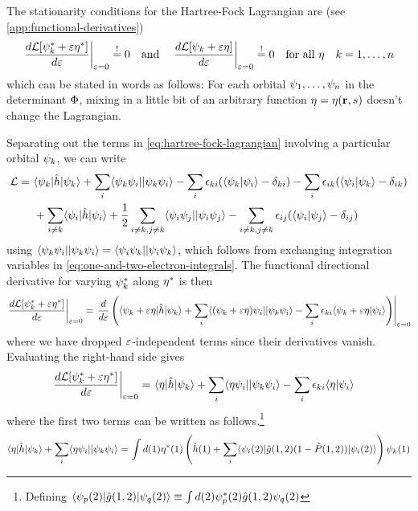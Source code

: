 \documentclass[11pt]{article}
\numberwithin{equation}{section}
\begin{document}
The stationarity conditions for the Hartree-Fock Lagrangian are (see \cref{app:functional-derivatives})
\begin{align}\label{eq:hartree-fock-lagrangian-stationarity}
\left.
  \frac {d\mathcal{L}[\psi _k^*+\varepsilon \eta ^*]}{d\varepsilon}
\right|_{\varepsilon=0}
\overset{!}=
  0
\hspace{10pt}
  \text{and}
\hspace{10pt}
\left.
  \frac {d\mathcal{L}[\psi _k+\varepsilon \eta ]}{d\varepsilon}
\right|_{\varepsilon=0}
\overset{!}=
  0
\hspace{10pt}
  \text{for all $\eta $}
&&
  k=1,\ldots,n
\end{align}
which can be stated in words as follows: For each orbital $\psi _1,\ldots,\psi _n$ in the determinant $\Phi $, mixing in a little bit of an arbitrary function $\eta=\eta(\mathbf{r},s)$ doesn't change the Lagrangian.

Separating out the terms in \cref{eq:hartree-fock-lagrangian} involving a particular orbital $\psi _k$, we can write
\begin{align*}
  \mathcal{L}
=&\
  \langle\psi _k|\hat{h}|\psi _k\rangle
+
  \sum_i
  \langle\psi _k\psi _i||\psi _k\psi _i\rangle
-
  \sum_i
  \epsilon _{ki}(\langle\psi _k|\psi _i\rangle-\delta _{ki})
-
  \sum_i
  \epsilon _{ik}(\langle\psi _i|\psi _k\rangle-\delta _{ik})
\\&\
+
  \sum_{i\neq k}
  \langle\psi _i|\hat{h}|\psi _i\rangle
+
  \frac {1}{2}
  \sum_{i\neq k,j\neq k}
  \langle\psi _i\psi _j||\psi _i\psi _j\rangle
-
  \sum_{i\neq k,j\neq k}
  \epsilon _{ij}(\langle\psi _i|\psi _j\rangle-\delta _{ij})
\end{align*}
using $\langle\psi _k\psi _i||\psi _k\psi _i\rangle=\langle\psi _i\psi _k||\psi _i\psi _k\rangle$, which follows from exchanging integration variables in \cref{eq:one-and-two-electron-integrals}.
The functional directional derivative for varying $\psi _k^*$ along $\eta ^*$ is then
\begin{align*}
\left.
  \frac {d\mathcal{L}[\psi _k^*+\varepsilon \eta^*]}{d\varepsilon}
\right|_{\varepsilon=0}
=
\left.
\frac {d}{d\varepsilon}
\left(
  \langle\psi _k+\varepsilon\eta|\hat{h}|\psi _k\rangle
+
  \sum_i
  \langle(\psi _k+\varepsilon\eta)\psi _i||\psi _k\psi _i\rangle
-
  \sum_i
  \epsilon _{ki}\langle\psi _k+\varepsilon\eta|\psi _i\rangle
\right)
\right|_{\varepsilon=0}
\end{align*}
where we have dropped $\varepsilon$-independent terms since their derivatives vanish.
Evaluating the right-hand side gives
\begin{align*}
\left.
  \frac {d\mathcal{L}[\psi _k^*+\varepsilon \eta ^*]}{d\varepsilon}
\right|_{\varepsilon=0}
=&\
  \langle\eta|\hat{h}|\psi _k\rangle
+
  \sum_i
  \langle\eta\psi _i||\psi _k\psi _i\rangle
-
  \sum_i
  \epsilon _{ki}
  \langle\eta|\psi _i\rangle
\end{align*}
where the first two terms can be written as follows.\footnote{Defining $\langle\psi _p(2)|\hat{g}(1,2)|\psi _q(2)\rangle\equiv\int d(2) \psi _p^*(2)\hat{g}(1,2)\psi _q(2)$}
\begin{align*}
  \langle\eta|\hat{h}|\psi _k\rangle
+
  \sum_i
  \langle\eta\psi _i||\psi _k\psi _i\rangle
=
\int d(1)
  \eta^*(1)
  \left(
    \hat{h}(1)
  +
    \sum_i
    \langle\psi _i(2)|\hat{g}(1,2)(1-\hat{P}(1,2))|\psi _i(2)\rangle
  \right)
  \psi _k(1)
\end{align*}
\end{document}
